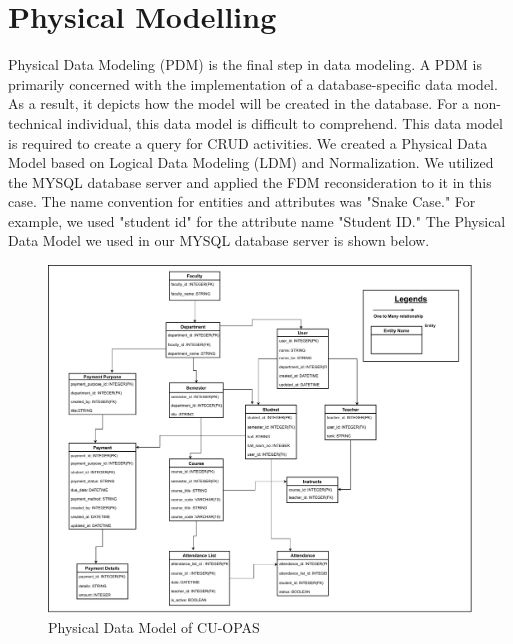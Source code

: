 \section{Physical Modelling}\label{sec:phy}
Physical Data Modeling (PDM) is the final step in data modeling. A PDM is primarily concerned with the implementation of a database-specific data model. As a result, it depicts how the model will be created in the database. For a non-technical individual, this data model is difficult to comprehend. This data model is required to create a query for CRUD activities.
We created a Physical Data Model based on Logical Data Modeling (LDM) and Normalization. We utilized the MYSQL database server and applied the FDM reconsideration to it in this case. The name convention for entities and attributes was "Snake Case." For example, we used "student id" for the attribute name "Student ID." The Physical Data Model we used in our MYSQL database server is shown below.\\

\begin{figure}[H]
    \centering
    \includegraphics[width=1\textwidth]{images/physical}
    \caption{Physical Data Model of CU-OPAS}
    \label{fig:physical}
\end{figure}

\clearpage
